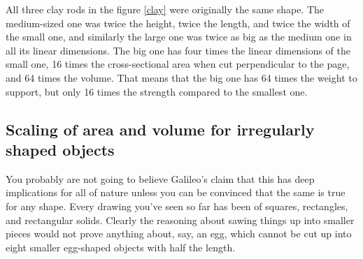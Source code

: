All three clay rods
 in the figure \ref{clay} were originally the same
 shape. The medium-sized one was
 twice the height, twice the length, and
 twice the width of the small one, and
 similarly the large one was twice as
 big as the medium one in all its linear
 dimensions. The big one has four
 times the linear dimensions of the
 small one, 16 times the cross-sectional
 area when cut perpendicular to the
 page, and 64 times the volume. That
 means that the big one has 64 times
 the weight to support, but only 16 times
 the strength compared to the smallest
 one.



\vspace{1.5mm}

\subsection{Scaling of area and volume for irregularly shaped objects}


You probably are not going to believe Galileo's claim that
this has deep implications for all of nature unless you can
be convinced that the same is true for any shape. Every
drawing you've seen so far has been of squares, rectangles,
and rectangular solids. Clearly the reasoning about sawing
things up into smaller pieces would not prove anything
about, say, an egg, which cannot be cut up into eight
smaller egg-shaped objects with half the length.





\vspace{1.5mm}

